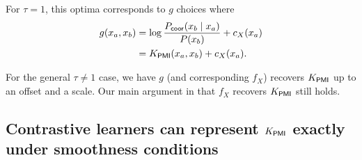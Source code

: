 \begin{enumerate}
    For $\tau = 1$, this optima corresponds to $g$ choices where \begin{align}
        g(x_a, x_b) 
        & = \log \frac{{P}_\mathsf{coor}(x_b \mathrel{\vert} x_a)}{P(x_b)} + c_X(x_a) \\
        & = K_\mathsf{PMI}(x_a, x_b) + c_X(x_a).
    \end{align}

    For the general $\tau \neq 1$ case, we have $g$ (and corresponding $f_X$) recovers $K_\mathsf{PMI}$ up to an offset and a scale. Our main argument in  that $f_X$ recovers $K_\mathsf{PMI}$ still holds.
\end{enumerate}

\subsection{Contrastive learners can represent $K_\mathsf{PMI}$ exactly under smoothness conditions}
\label{sec:analysis_contrastive-exact-repr}




